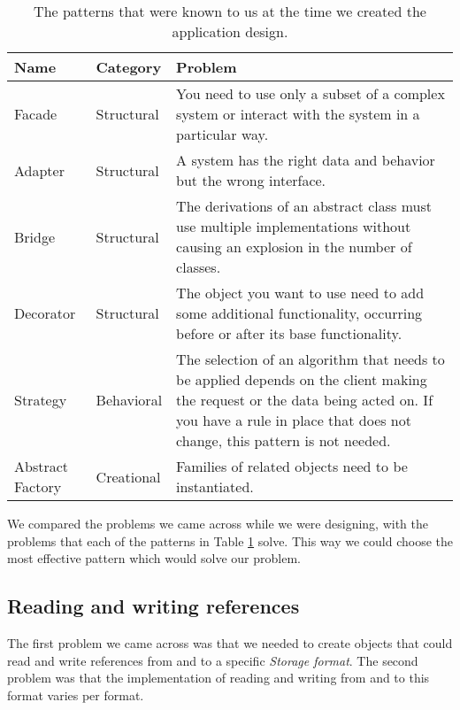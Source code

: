 \documentclass[a4paper]{article}
\begin{document}
\begin{table}
	\centering
	\caption{The patterns that were known to us at the time we created the application design.}
	\label{table:7}
	\begin{tabular}{|p{2cm}|p{2cm}|p{7.5cm}|} \hline
		\textbf{Name} & \textbf{Category} & \textbf{Problem} \\ \hline
		
		Facade & Structural & You need to use only a subset of a complex system or interact with the system in a particular way. \\ \hline
		
		Adapter & Structural & A system has the right data and behavior but the wrong interface. \\ \hline
		
		Bridge & Structural & The derivations of an abstract class must use multiple implementations without causing an explosion in the number of classes.\\ \hline
		
		Decorator & Structural & The object you want to use need to add some additional functionality, occurring before or after its base functionality. \\ \hline
		
		Strategy & Behavioral & The selection of an algorithm that needs to be applied depends on the client making the request or the data being acted on. If you have a rule in place that does not change, this pattern is not needed. \\ \hline
		
		Abstract Factory & Creational & Families of related objects need to be instantiated. \\ \hline
	\end{tabular}
\end{table}

We compared the problems we came across while we were designing, with the problems that each of the patterns in Table \ref{table:7} solve. This way we could choose the most effective pattern which would solve our problem.

\subsection{Reading and writing references}
The first problem we came across was that we needed to create objects that could read and write references from and to a specific \textit{Storage format}. The second problem was that the implementation of reading and writing from and to this format varies per format.
\end{document}
